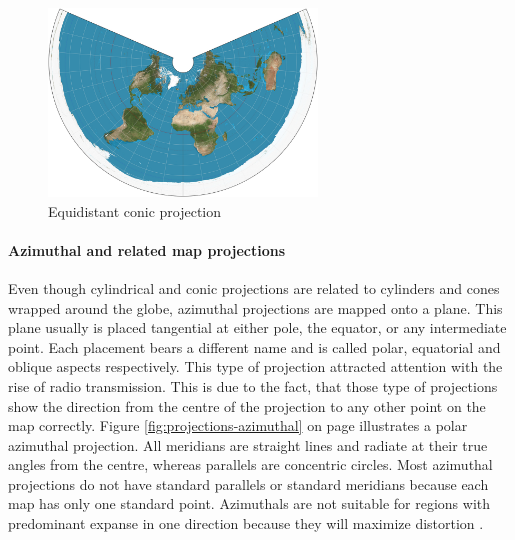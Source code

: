 \begin{enumerate}
\begin{figure}[!htb]
\centering
\includegraphics[height=5cm,keepaspectratio]{images/methods/projections/equidistant.jpg}
\caption[
    Equidistant conic projection, Urldate: 07.2016 \newline
    \small\texttt{\url{https://upload.wikimedia.org/wikipedia/commons/d/d8/Equidistant_conic_projection_SW.JPG}}.
]{Equidistant conic projection}
\label{fig:projections-equidistant}
\end{figure}

\end{enumerate}
\paragraph{Azimuthal and related map projections}
Even though cylindrical and conic projections are related to cylinders and cones wrapped around the globe, azimuthal projections are mapped onto a plane. This plane usually is placed tangential at either pole, the equator, or any intermediate point. Each placement bears a different name and is called polar, equatorial and oblique aspects respectively. This type of projection attracted attention with the rise of radio transmission. This is due to the fact, that those type of projections show the direction from the centre of the projection to any other point on the map correctly. Figure \ref{fig:projections-azimuthal} on page \pageref{fig:projections-azimuthal} illustrates a polar azimuthal projection. All meridians are straight lines and radiate at their true angles from the centre, whereas parallels are concentric circles. Most azimuthal projections do not have standard parallels or standard meridians because each map has only one standard point. Azimuthals are not suitable for regions with predominant expanse in one direction because they will maximize distortion .

